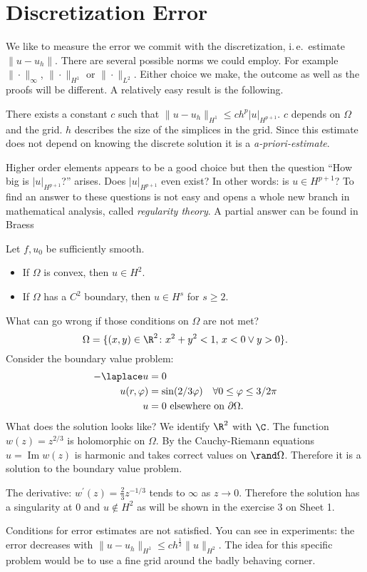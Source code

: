 \section{Discretization Error}
We like to measure the error we commit with the discretization, i.\,e.\ estimate $\|u-u_h\|$. There are several possible norms we could employ. For example $\|\cdot\|_\infty$, $\|\cdot\|_{H^1}$ or $\|\cdot\|_{L^2}$. Either choice we make, the outcome as well as the proofs will be different. A relatively easy result is the following.
\begin{theorem}
  There exists a constant $c$ such that $\|u-u_h\|_{H^1}\leq ch^p|u|_{H^{p+1}}$. $c$ depends on $\Omega$ and the grid. $h$ describes the size of the simplices in the grid. Since this estimate does not depend on knowing the discrete solution it is a \textit{a-priori-estimate}.
\end{theorem}
Higher order elements appears to be a good choice but then
the question \enquote{How big is $|u|_{H^{p+1}}$?} arises. Does $|u|_{H^{p+1}}$ even exist? In other words: is $u\in H^{p+1}$? To find an answer to these questions is not easy and opens a whole new branch in mathematical analysis, called \textit{regularity theory}. A partial answer can be found in Braess %
\begin{theorem}%
Let $f,u_0$ be sufficiently smooth.
\begin{itemize}
  \item If $\Omega$ is convex, then $u\in H^2$.
  \item If $\Omega$ has a $C^2$ boundary, then $u\in H^s$ for $s\geq 2$.
\end{itemize}
\end{theorem}
\begin{example}
What can go wrong if those conditions on $\Omega$ are not met?
\begin{equation*}
  \Omega=\{(x,y)\in\R^2\colon x^2+y^2<1,\,x<0\lor y>0\}.
\end{equation*}
Consider the boundary value problem:
\begin{align*}
	-\laplace u&=0\\
	u(r,\varphi)&=\sin(2/3\varphi)\quad \forall 0\leq\varphi\leq3/2\pi \\
	u&=0 \text{ elsewhere on } \partial\Omega.
\end{align*}
What does the solution looks like? We identify $\R^2$ with $\C$. The function $w(z)=z^{2/3}$ is holomorphic on $\Omega$. By the Cauchy-Riemann equations $u = \operatorname{Im}w(z)$ is harmonic and takes correct values on $\boundary\Omega$. Therefore it is a solution to the boundary value problem.

The derivative: $w^\prime(z)=\frac23z^{-1/3}$ tends to $\infty$ as $z\to 0$. Therefore the solution has a singularity at $0$ and $u\notin H^2$ as will be shown in the exercise 3 on Sheet 1.
\end{example}

Conditions for error estimates are not satisfied. You can see in experiments: the error decreases with $\|u - u_h\|_{H^1} \leq c h^{\frac{1}{2}}\|u\|_{H^2}$. The idea for this specific problem would be to use a fine grid around the badly behaving corner.

